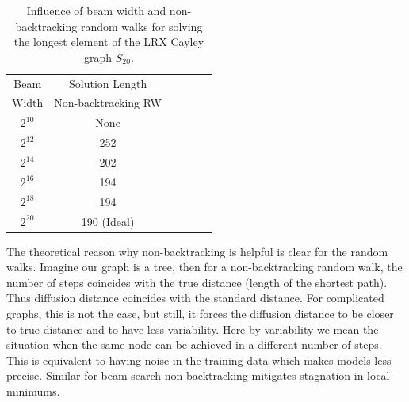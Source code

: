 \documentclass[reqno,11pt]{amsart}
\begin{document}
\begin{table}[ht]
    \centering
    \begin{tabular}{|c|c|c|c|c|c|}
        \hline
        Beam   &  Solution Length                  \\
       Width   &  Non-backtracking RW    \\
        \hline
        $2^{10}$    &       None           \\
        \hline
        $2^{12}$   &       252             \\
        \hline      
        $2^{14}$    &       202             \\
        \hline    
        $2^{16}$    &       194            \\
        \hline 
        $2^{18}$    &       194             \\
        \hline  
        $2^{20}$     &       190 (Ideal)    \\
        \hline        
    \end{tabular}
    \captionsetup{skip=10pt} 
    \caption{Influence of beam width and non-backtracking random walks for solving the longest element of the LRX Cayley graph $S_{20}$.     }
    \label{tab:beam_size}
\end{table}


The theoretical reason why non-backtracking is helpful is clear for the random walks. Imagine our graph is a tree, then  for a non-backtracking  random walk, the number of steps coincides with the true distance (length of the shortest path). Thus diffusion distance coincides with  the standard
distance. For complicated graphs, this is not the case, but still, it forces the diffusion distance to be closer to true distance and to have less variability. Here by variability we mean the situation when the same node can be achieved in a different number of steps. This is equivalent to having noise in the training data which makes models less precise. Similar for beam search non-backtracking mitigates stagnation
in local minimums. 
\end{document}
